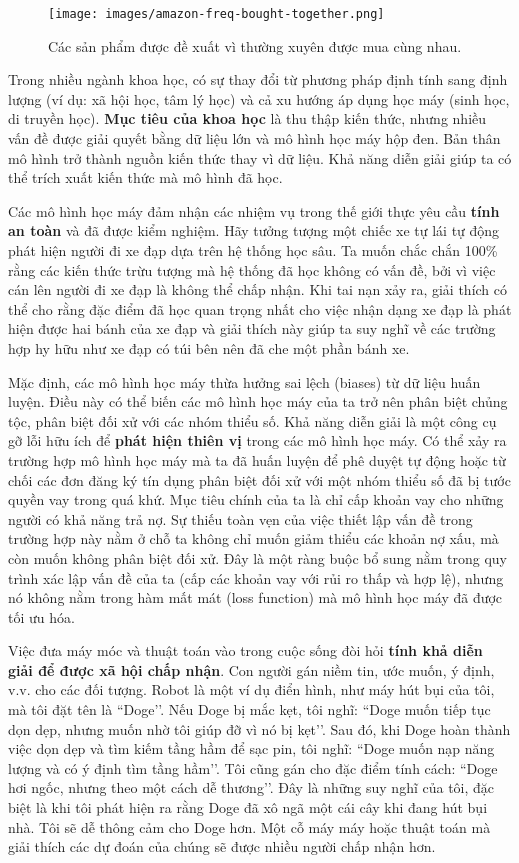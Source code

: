 \begin{figure*}[h!]
	\centering
	\texttt{[image: images/amazon-freq-bought-together.png]}
	\caption{Các sản phẩm được đề xuất vì thường xuyên được mua cùng nhau.}
\end{figure*}

Trong nhiều ngành khoa học, có sự thay đổi từ phương pháp định tính sang định lượng (ví dụ: xã hội học, tâm lý học) và cả xu hướng áp dụng học máy (sinh học, di truyền học). \textbf{Mục tiêu của khoa học} là thu thập kiến thức, nhưng nhiều vấn đề được giải quyết bằng dữ liệu lớn và mô hình học máy hộp đen. Bản thân mô hình trở thành nguồn kiến thức thay vì dữ liệu. Khả năng diễn giải giúp ta có thể trích xuất kiến thức mà mô hình đã học.

Các mô hình học máy đảm nhận các nhiệm vụ trong thế giới thực yêu cầu \textbf{tính an toàn} và đã được kiểm nghiệm. Hãy tưởng tượng một chiếc xe tự lái tự động phát hiện người đi xe đạp dựa trên hệ thống học sâu. Ta muốn chắc chắn 100\% rằng các kiến thức trừu tượng mà hệ thống đã học không có vấn đề, bởi vì việc cán lên người đi xe đạp là không thể chấp nhận. Khi tai nạn xảy ra, giải thích có thể cho rằng đặc điểm đã học quan trọng nhất cho việc nhận dạng xe đạp là phát hiện được hai bánh của xe đạp và giải thích này giúp ta suy nghĩ về các trường hợp hy hữu như xe đạp có túi bên nên đã che một phần bánh xe.

Mặc định, các mô hình học máy thừa hưởng sai lệch (biases) từ dữ liệu huấn luyện. Điều này có thể biến các mô hình học máy của ta trở nên phân biệt chủng tộc, phân biệt đối xử với các nhóm thiểu số. Khả năng diễn giải là một công cụ gỡ lỗi hữu ích để \textbf{phát hiện thiên vị}  trong các mô hình học máy. Có thể xảy ra trường hợp mô hình học máy mà ta đã huấn luyện để phê duyệt tự động hoặc từ chối các đơn đăng ký tín dụng phân biệt đối xử với một nhóm thiểu số đã bị tước quyền vay trong quá khứ. Mục tiêu chính của ta là chỉ cấp khoản vay cho những người có khả năng trả nợ. Sự thiếu toàn vẹn của việc thiết lập vấn đề trong trường hợp này nằm ở chỗ ta không chỉ muốn giảm thiểu các khoản nợ xấu, mà còn muốn không phân biệt đối xử. Đây là một ràng buộc bổ sung nằm trong quy trình xác lập vấn đề của ta (cấp các khoản vay với rủi ro thấp và hợp lệ), nhưng nó không nằm trong hàm mất mát (loss function) mà mô hình học máy đã được tối ưu hóa.

Việc đưa máy móc và thuật toán vào trong cuộc sống đòi hỏi \textbf{tính khả diễn giải để được xã hội chấp nhận}.  Con người gán niềm tin, ước muốn, ý định, v.v. cho các đối tượng. Robot là một ví dụ điển hình, như máy hút bụi của tôi, mà tôi đặt tên là ``Doge’’. Nếu Doge bị mắc kẹt, tôi nghĩ: ``Doge muốn tiếp tục dọn dẹp, nhưng muốn nhờ tôi giúp đỡ vì nó bị kẹt’’. Sau đó, khi Doge hoàn thành việc dọn dẹp và tìm kiếm tầng hầm để sạc pin, tôi nghĩ: ``Doge muốn nạp năng lượng và có ý định tìm tầng hầm’’. Tôi cũng gán cho đặc điểm tính cách: ``Doge hơi ngốc, nhưng theo một cách dễ thương’’. Đây là những suy nghĩ của tôi, đặc biệt là khi tôi phát hiện ra rằng Doge đã xô ngã một cái cây khi đang hút bụi nhà. Tôi sẽ dễ thông cảm cho Doge hơn. Một cỗ máy máy hoặc thuật toán mà giải thích các dự đoán của chúng sẽ được nhiều người chấp nhận hơn. 

